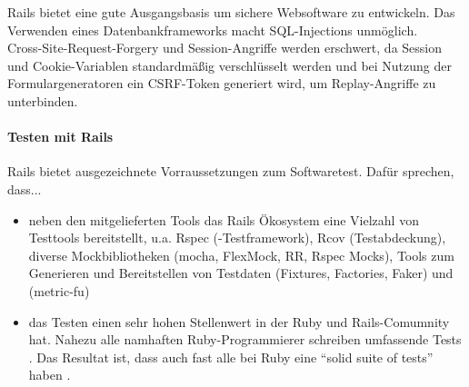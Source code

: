 Rails bietet eine gute Ausgangsbasis um sichere Websoftware zu entwickeln. Das Verwenden eines Datenbankframeworks macht SQL-Injections unmöglich. \\
Cross-Site-Request-Forgery und Session-Angriffe werden erschwert, da Session und Cookie-Variablen standardmäßig verschlüsselt werden und bei Nutzung der Formulargeneratoren ein CSRF-Token generiert wird, um Replay-Angriffe zu unterbinden.


\paragraph{Testen mit Rails}
Rails bietet ausgezeichnete Vorraussetzungen zum Softwaretest. Dafür sprechen, dass...

\begin{itemize}
 \item neben den mitgelieferten Tools das Rails Ökosystem eine Vielzahl von Testtools bereitstellt, u.a. Rspec (-Testframework), Rcov (Testabdeckung), diverse Mockbibliotheken (mocha, FlexMock, RR, Rspec Mocks), Tools zum Generieren und Bereitstellen von Testdaten (Fixtures, Factories, Faker) und  (metric-fu)
 \item das Testen einen sehr hohen Stellenwert in der Ruby und Rails-Comumnity hat. Nahezu alle namhaften Ruby-Programmierer schreiben umfassende Tests \citep{devries_rails_2008}. Das Resultat ist, dass auch fast alle  bei Ruby eine "`solid suite of tests"' haben \citep{devries_rails_2008}.
\end{itemize}

